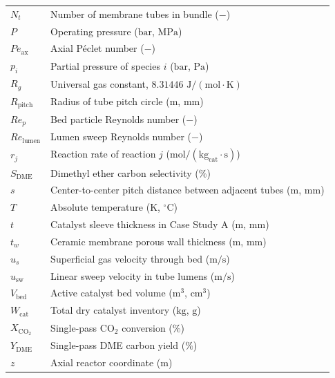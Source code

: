 \documentclass[12pt,a4paper]{article}
\begin{document}
\begin{tabular}{ll}
$N_t$ & Number of membrane tubes in bundle ($-$) \\
$P$ & Operating pressure ($\text{bar}$, $\text{MPa}$) \\
$Pe_{\text{ax}}$ & Axial P\'eclet number ($-$) \\
$p_i$ & Partial pressure of species $i$ ($\text{bar}$, $\text{Pa}$) \\
$R_g$ & Universal gas constant, $8.31446\text{ J}/(\text{mol}\cdot\text{K})$ \\
$R_{\text{pitch}}$ & Radius of tube pitch circle ($\text{m}$, $\text{mm}$) \\
$Re_p$ & Bed particle Reynolds number ($-$) \\
$Re_{\text{lumen}}$ & Lumen sweep Reynolds number ($-$) \\
$r_j$ & Reaction rate of reaction $j$ ($\text{mol}/(\text{kg}_{\text{cat}}\cdot\text{s})$) \\
$S_{\text{DME}}$ & Dimethyl ether carbon selectivity ($\%$) \\
$s$ & Center-to-center pitch distance between adjacent tubes ($\text{m}$, $\text{mm}$) \\
$T$ & Absolute temperature ($\text{K}$, $^\circ\text{C}$) \\
$t$ & Catalyst sleeve thickness in Case Study A ($\text{m}$, $\text{mm}$) \\
$t_w$ & Ceramic membrane porous wall thickness ($\text{m}$, $\text{mm}$) \\
$u_s$ & Superficial gas velocity through bed ($\text{m/s}$) \\
$u_{\text{sw}}$ & Linear sweep velocity in tube lumens ($\text{m/s}$) \\
$V_{\text{bed}}$ & Active catalyst bed volume ($\text{m}^3$, $\text{cm}^3$) \\
$W_{\text{cat}}$ & Total dry catalyst inventory ($\text{kg}$, $\text{g}$) \\
$X_{\text{CO}_2}$ & Single-pass $\text{CO}_2$ conversion ($\%$) \\
$Y_{\text{DME}}$ & Single-pass DME carbon yield ($\%$) \\
$z$ & Axial reactor coordinate ($\text{m}$)
\end{tabular}
\end{document}
